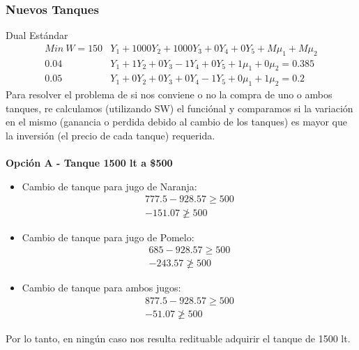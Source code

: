 \begin{homeworkProblem}[-1][Citrus]
\subsubsection{Nuevos Tanques}

Dual Estándar
\begin{align*}
  Min\ W = 150&Y_1 + 1000Y_2 + 1000Y_3 + 0Y_4 + 0Y_5 + M\mu_1 + M\mu_2 \\
  0.04&Y_1 + 1Y_2 + 0Y_3 - 1Y_4 + 0Y_5 + 1\mu_1 + 0\mu_2 = 0.385 \\
  0.05&Y_1 + 0Y_2 + 0Y_3 + 0Y_4 - 1Y_5 + 0\mu_1 + 1\mu_2 = 0.2 
\end{align*}
Para resolver el problema de si nos conviene o no la compra de uno o ambos tanques, re calculamos (utilizando SW) el funciónal y comparamos si la variación en el mismo (ganancia o perdida debido al cambio de los tanques) es mayor que la inversión (el precio de cada tanque) requerida. \\ \\
\textbf{Opción A - Tanque 1500 lt a \$500} \\
\begin{itemize}
  \item Cambio de tanque para jugo de Naranja:
  \begin{align*}
    777.5 - 928.57 \ge 500 \\
    - 151.07 \ngeq 500 
  \end{align*}
  \item Cambio de tanque para jugo de Pomelo:
  \begin{align*}
    685 - 928.57 \ge 500 \\
    - 243.57 \ngeq 500 
  \end{align*}
  \item Cambio de tanque para ambos jugos:
  \begin{align*}
    877.5 - 928.57 \ge 500 \\
    - 51.07 \ngeq 500 
  \end{align*}
\end{itemize}
Por lo tanto, en ningún caso nos resulta redituable adquirir el tanque de 1500 lt.\\ \\ \\

\end{homeworkProblem}
